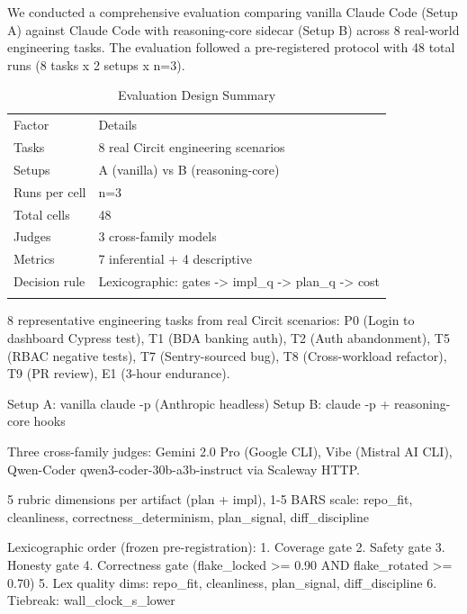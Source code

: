 

We conducted a comprehensive evaluation comparing vanilla Claude Code (Setup A) against Claude Code with reasoning-core sidecar (Setup B) across 8 real-world engineering tasks. The evaluation followed a pre-registered protocol with 48 total runs (8 tasks x 2 setups x n=3).


\begin{table}[t]
    \centering
    \caption{Evaluation Design Summary}
    \label{tab:evaluation_design}
    \begin{tabular}{ll}
        \toprule
        Factor & Details \\\n        \midrule
        Tasks & 8 real Circit engineering scenarios \\\n        Setups & A (vanilla) vs B (reasoning-core) \\\n        Runs per cell & n=3 \\\n        Total cells & 48 \\\n        Judges & 3 cross-family models \\\n        Metrics & 7 inferential + 4 descriptive \\\n        Decision rule & Lexicographic: gates -> impl_q -> plan_q -> cost \\\n        \bottomrule
    \end{tabular}
\end{table}


8 representative engineering tasks from real Circit scenarios:
P0 (Login to dashboard Cypress test), T1 (BDA banking auth), T2 (Auth abandonment), T5 (RBAC negative tests), T7 (Sentry-sourced bug), T8 (Cross-workload refactor), T9 (PR review), E1 (3-hour endurance).


Setup A: vanilla claude -p (Anthropic headless)
Setup B: claude -p + reasoning-core hooks


Three cross-family judges: Gemini 2.0 Pro (Google CLI), Vibe (Mistral AI CLI), Qwen-Coder qwen3-coder-30b-a3b-instruct via Scaleway HTTP.


5 rubric dimensions per artifact (plan + impl), 1-5 BARS scale:
repo_fit, cleanliness, correctness_determinism, plan_signal, diff_discipline


Lexicographic order (frozen pre-registration):
1. Coverage gate
2. Safety gate
3. Honesty gate
4. Correctness gate (flake_locked >= 0.90 AND flake_rotated >= 0.70)
5. Lex quality dims: repo_fit, cleanliness, plan_signal, diff_discipline
6. Tiebreak: wall_clock_s_lower

